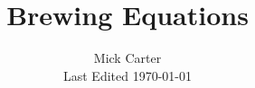 \documentclass{paper}
\title{Brewing Equations}
\author{Mick Carter\\
        Last Edited \today}
\newcommand{\dobib}{ %
}
\begin{document}
\renewcommand{\dobib}{} %

\maketitle

\tableofcontents



















\printbibliography
\end{document}
